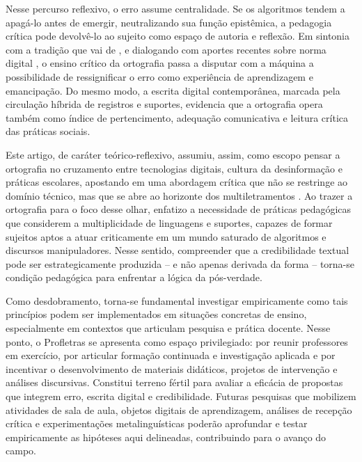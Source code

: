 \documentclass[portuguese]{textolivre}
\begin{document}
Nesse percurso reflexivo, o erro assume centralidade. Se os algoritmos tendem a apagá-lo antes de emergir, neutralizando sua função epistêmica, a pedagogia crítica pode devolvê-lo ao sujeito como espaço de autoria e reflexão. Em sintonia com a tradição que vai de \textcite{ferreiro1985psicogenese,freire1987pedagogia}, e dialogando com aportes recentes sobre norma digital \cite{fernandezjulia2024normadigital}, o ensino crítico da ortografia passa a disputar com a máquina a possibilidade de ressignificar o erro como experiência de aprendizagem e emancipação. Do mesmo modo, a escrita digital contemporânea, marcada pela circulação híbrida de registros e suportes, evidencia que a ortografia opera também como índice de pertencimento, adequação comunicativa e leitura crítica das práticas sociais.

Este artigo, de caráter teórico-reflexivo, assumiu, assim, como escopo pensar a ortografia no cruzamento entre tecnologias digitais, cultura da desinformação e práticas escolares, apostando em uma abordagem crítica que não se restringe ao domínio técnico, mas que se abre ao horizonte dos multiletramentos \cite{newlondongroup1996multiliteracies,rojo2009letramentos,rojo2012multiletramentos}. Ao trazer a ortografia para o foco desse olhar, enfatizo a necessidade de práticas pedagógicas que considerem a multiplicidade de linguagens e suportes, capazes de formar sujeitos aptos a atuar criticamente em um mundo saturado de algoritmos e discursos manipuladores. Nesse sentido, compreender que a credibilidade textual pode ser estrategicamente produzida – e não apenas derivada da forma – torna-se condição pedagógica para enfrentar a lógica da pós-verdade.

Como desdobramento, torna-se fundamental investigar empiricamente como tais princípios podem ser implementados em situações concretas de ensino, especialmente em contextos que articulam pesquisa e prática docente. Nesse ponto, o Profletras se apresenta como espaço privilegiado: por reunir professores em exercício, por articular formação continuada e investigação aplicada e por incentivar o desenvolvimento de materiais didáticos, projetos de intervenção e análises discursivas. Constitui terreno fértil para avaliar a eficácia de propostas que integrem erro, escrita digital e credibilidade. Futuras pesquisas que mobilizem atividades de sala de aula, objetos digitais de aprendizagem, análises de recepção crítica e experimentações metalinguísticas poderão aprofundar e testar empiricamente as hipóteses aqui delineadas, contribuindo para o avanço do campo.
\end{document}
